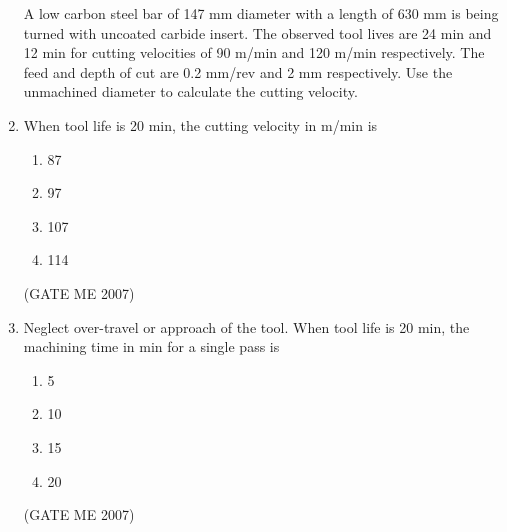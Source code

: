 \documentclass[journal]{IEEEtran}
\begin{document}
\begin{enumerate}
A low carbon steel bar of 147 mm diameter with a length of 630 mm is being turned with uncoated carbide insert. The observed tool lives are 24 min and 12 min for cutting velocities of 90 m/min and 120 m/min respectively. The feed and depth of cut are 0.2 mm/rev and 2 mm respectively. Use the unmachined diameter to calculate the cutting velocity.

\item When tool life is 20 min, the cutting velocity in m/min is
\begin{multicols}{4}
\begin{enumerate}
\item 87
\item 97
\item 107
\item 114
\end{enumerate}
\end{multicols}
\hfill (GATE ME 2007)

\item Neglect over-travel or approach of the tool. When tool life is 20 min, the machining time in min for a single pass is
\begin{multicols}{4}
\begin{enumerate}
\item 5
\item 10
\item 15
\item 20
\end{enumerate}
\end{multicols}
\hfill (GATE ME 2007)

\end{enumerate}
\end{document}
